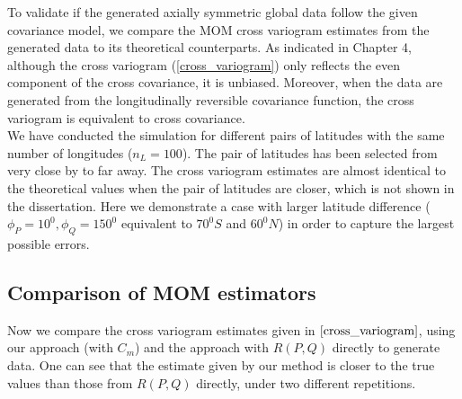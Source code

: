 
%
%

To validate if the generated axially symmetric global data follow the given covariance model, we compare the MOM cross variogram estimates from the generated data to its theoretical counterparts. As indicated in Chapter 4, although the cross variogram (\ref{cross_variogram}) only reflects the even component of the cross covariance, it is unbiased. Moreover, when the data are generated from the longitudinally reversible covariance function, the cross variogram is equivalent to cross covariance. \\

We have conducted the simulation for different pairs of latitudes with the same number of longitudes ($n_L = 100$). The pair of latitudes has been selected from very close by to far away. The cross variogram estimates are almost identical to the theoretical values when the pair of latitudes are closer, which is not shown in the dissertation. Here we demonstrate a case with larger latitude difference ($\phi_P = 10^0, \phi_Q = 150^0$ equivalent to $70^0S$ and $60^0N$) in order to capture the largest possible errors. 


\vskip 24pt

\subsection{\bf Comparison of MOM estimators}

Now we compare the cross variogram estimates given in $\eqref{cross_variogram}$, using our approach (with $C_m$) and the approach with $R(P,Q)$ directly to generate data. One can see that the estimate given by our method is closer to the true values than those from $R(P, Q)$ directly, under two different repetitions.

